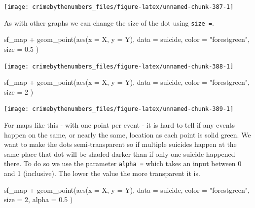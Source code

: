 \documentclass[
]{krantz}
\makeatletter
\newenvironment{Shaded}{\begin{snugshade}}{\end{snugshade}}
\newcommand{\AttributeTok}[1]{\textcolor[rgb]{0.61,0.61,0.61}{#1}}
\newcommand{\DecValTok}[1]{\textcolor[rgb]{0.06,0.06,0.06}{#1}}
\newcommand{\FloatTok}[1]{\textcolor[rgb]{0.06,0.06,0.06}{#1}}
\newcommand{\FunctionTok}[1]{\textcolor[rgb]{0,0,0}{#1}}
\newcommand{\NormalTok}[1]{#1}
\newcommand{\SpecialCharTok}[1]{\textcolor[rgb]{0,0,0}{#1}}
\newcommand{\StringTok}[1]{\textcolor[rgb]{0.5,0.5,0.5}{#1}}
\newenvironment{kframe}{%
\medskip{}
\setlength{\fboxsep}{.8em}
 \def\at@end@of@kframe{}%
 \ifinner\ifhmode%
  \def\at@end@of@kframe{\end{minipage}}%
  \begin{minipage}{\columnwidth}%
 \fi\fi%
 \def\FrameCommand##1{\hskip\@totalleftmargin \hskip-\fboxsep
 \colorbox{shadecolor}{##1}\hskip-\fboxsep
     \hskip-\linewidth \hskip-\@totalleftmargin \hskip\columnwidth}%
 \MakeFramed {\advance\hsize-\width
   \@totalleftmargin\z@ \linewidth\hsize
   \@setminipage}}%
 {\par\unskip\endMakeFramed%
 \at@end@of@kframe}
\renewenvironment{Shaded}{\begin{kframe}}{\end{kframe}}
\makeatother
\begin{document}
\begin{center}\texttt{[image: crimebythenumbers\_files/figure-latex/unnamed-chunk-387-1]} \end{center}

As with other graphs we can change the size of the dot using
\texttt{size\ =}.

\begin{Shaded}
\begin{Highlighting}[]
\NormalTok{sf\_map }\SpecialCharTok{+}
  \FunctionTok{geom\_point}\NormalTok{(}\FunctionTok{aes}\NormalTok{(}\AttributeTok{x =}\NormalTok{ X, }\AttributeTok{y =}\NormalTok{ Y),}
    \AttributeTok{data  =}\NormalTok{ suicide,}
    \AttributeTok{color =} \StringTok{"forestgreen"}\NormalTok{,}
    \AttributeTok{size  =} \FloatTok{0.5}
\NormalTok{  )}
\end{Highlighting}
\end{Shaded}

\begin{center}\texttt{[image: crimebythenumbers\_files/figure-latex/unnamed-chunk-388-1]} \end{center}

\begin{Shaded}
\begin{Highlighting}[]
\NormalTok{sf\_map }\SpecialCharTok{+}
  \FunctionTok{geom\_point}\NormalTok{(}\FunctionTok{aes}\NormalTok{(}\AttributeTok{x =}\NormalTok{ X, }\AttributeTok{y =}\NormalTok{ Y),}
    \AttributeTok{data  =}\NormalTok{ suicide,}
    \AttributeTok{color =} \StringTok{"forestgreen"}\NormalTok{,}
    \AttributeTok{size  =} \DecValTok{2}
\NormalTok{  )}
\end{Highlighting}
\end{Shaded}

\begin{center}\texttt{[image: crimebythenumbers\_files/figure-latex/unnamed-chunk-389-1]} \end{center}

For maps like this - with one point per event - it is hard
to tell if any events happen on the same, or nearly the
same, location as each point is solid green. We want to make
the dots semi-transparent so if multiple suicides happen at
the same place that dot will be shaded darker than if only
one suicide happened there. To do so we use the parameter
\texttt{alpha\ =} which takes an input between 0 and 1
(inclusive). The lower the value the more transparent it is.

\begin{Shaded}
\begin{Highlighting}[]
\NormalTok{sf\_map }\SpecialCharTok{+}
  \FunctionTok{geom\_point}\NormalTok{(}\FunctionTok{aes}\NormalTok{(}\AttributeTok{x =}\NormalTok{ X, }\AttributeTok{y =}\NormalTok{ Y),}
    \AttributeTok{data  =}\NormalTok{ suicide,}
    \AttributeTok{color =} \StringTok{"forestgreen"}\NormalTok{,}
    \AttributeTok{size  =} \DecValTok{2}\NormalTok{,}
    \AttributeTok{alpha =} \FloatTok{0.5}
\NormalTok{  )}
\end{Highlighting}
\end{Shaded}
\end{document}

